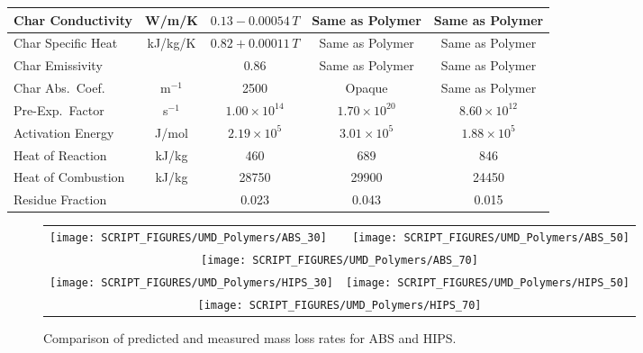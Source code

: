 \begin{table}[h!]
\begin{tabular*}{\textwidth}{|l|@{\extracolsep\fill}c@{\extracolsep\fill}|c|c|c|}
Char Conductivity           & W/m/K         & $0.13-0.00054 \, T$     & Same as Polymer         & Same as Polymer          \\ \hline
Char Specific Heat          & kJ/kg/K       & $0.82+0.00011 \, T$     & Same as Polymer         & Same as Polymer          \\ \hline
Char Emissivity             &               & 0.86                    & Same as Polymer         & Same as Polymer          \\ \hline
Char Abs.~Coef.             & m$^{-1}$      & 2500                    & Opaque                  & Same as Polymer          \\ \hline
Pre-Exp.~Factor             & s$^{-1}$      & $1.00\times 10^{14}$    & $1.70\times 10^{20}$    & $8.60\times 10^{12}$     \\ \hline
Activation Energy           & J/mol       & $2.19\times 10^5$       & $3.01\times 10^5$       & $1.88\times 10^5$        \\ \hline
Heat of Reaction            & kJ/kg         & 460                     & 689                     & 846                      \\ \hline
Heat of Combustion          & kJ/kg         & 28750                   & 29900                   & 24450                    \\ \hline
Residue Fraction            &               & 0.023                   & 0.043                   & 0.015                    \\ \hline
\end{tabular*}
\label{Properties_ABS_HIPS_PMMA}
\end{table}


\begin{figure}[p]
\begin{tabular*}{\textwidth}{l@{\extracolsep{\fill}}r}
\texttt{[image: SCRIPT\_FIGURES/UMD\_Polymers/ABS\_30]} &
\texttt{[image: SCRIPT\_FIGURES/UMD\_Polymers/ABS\_50]} \\
\multicolumn{2}{c}{\texttt{[image: SCRIPT\_FIGURES/UMD\_Polymers/ABS\_70]}} \\
\texttt{[image: SCRIPT\_FIGURES/UMD\_Polymers/HIPS\_30]} &
\texttt{[image: SCRIPT\_FIGURES/UMD\_Polymers/HIPS\_50]} \\
\multicolumn{2}{c}{\texttt{[image: SCRIPT\_FIGURES/UMD\_Polymers/HIPS\_70]}}
\end{tabular*}
\caption[Mass loss rate of ABS and HIPS]
{Comparison of predicted and measured mass loss rates for ABS and HIPS.}
\label{ABS_HIPS}
\end{figure}

